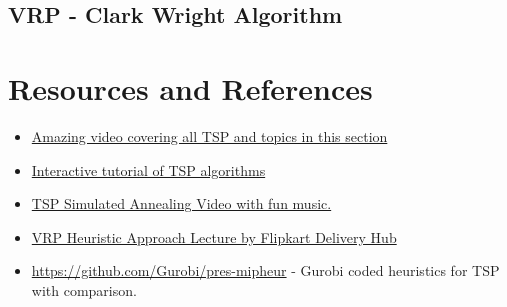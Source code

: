 \subsection{VRP - Clark Wright Algorithm}

\section*{Resources and References}
\begin{resource}

\begin{itemize}
\item \href{https://www.youtube.com/watch?v=GiDsjIBOVoA&ab_channel=Reducible}{Amazing video covering all TSP and topics in this section}
\item \href{https://cse442-17f.github.io/Traveling-Salesman-Algorithms/}{Interactive tutorial of TSP algorithms}
\item \href{https://www.youtube.com/watch?v=SC5CX8drAtU}{TSP Simulated Annealing Video with fun music.}
\item \href{https://www.youtube.com/watch?v=v9tUEsHD6BE&ab_channel=HasgeekTV}{VRP Heuristic Approach Lecture by Flipkart Delivery Hub}
\item \url{https://github.com/Gurobi/pres-mipheur} - Gurobi coded heuristics for TSP with comparison.  
\end{itemize}
\end{resource}

